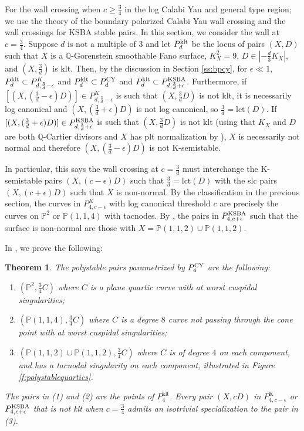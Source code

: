 \documentclass[11pt]{amsart}
\numberwithin{equation}{section}
\newtheorem{thm}[theorem]{Theorem}
\theoremstyle{definition}
\newcommand{\bQ}{\mathbb{Q}}
\newcommand{\KSBA}{{\rm KSBA}}
\newcommand{\bP}{\mathbb{P}}
\newcommand{\klt}{\mathrm{klt}}
\newcommand{\lct}{\mathrm{lct}}
\newcommand{\K}{\mathrm{K}}
\begin{document}
For the wall crossing when $c \ge \frac{3}{4}$ in the log Calabi Yau and general type region; we use the theory of the boundary polarized Calabi Yau wall crossing and the wall crossings for KSBA stable pairs.  In this section, we consider the wall at $c = \frac{3}{4}$.  Suppose $d$ is not a multiple of $3$ and let $P_d^{\rm klt} $ be the locus of pairs $(X,D)$ such that $X$ is a $\bQ$-Gorenstein smoothable Fano surface, $K_X^2 = 9$, $D \in |-\frac{d}{3}K_X|$, and $(X,\frac{3}{d})$ is klt.  Then, by the discussion in Section \ref{ss:bpcy}, for $\epsilon \ll1$, $P_d^{\rm klt} \subset P^K_{d, \frac{3}{d} - \epsilon}$ and $P_d^{\rm klt} \subset P^{\rm CY}_{d}$ and $P_d^{\rm klt} \subset P^{\rm KSBA}_{d, \frac{3}{d} + \epsilon}$.  Furthermore, if $[(X,(\frac{3}{d}-\epsilon)D)] \in P^K_{d, \frac{3}{d} - \epsilon} $ is such that $(X,\frac{3}{d}D)$ is not klt, it is necessarily log canonical and $(X,(\frac{3}{d} + \epsilon)D)$ is not log canonical, so $\frac{3}{d} = \lct (D)$. If $[(X,(\frac{3}{d}+\epsilon)D)] \in P^{\rm KSBA}_{d, \frac{3}{d} + \epsilon} $ is such that $(X,\frac{3}{d}D)$ is not klt (using that $K_X$ and $D$ are both $\bQ$-Cartier divisors and $X$ has plt normalization by \cite[Theorem 7.1]{hacking}), $X$ is necessarily not normal and therefore $(X,(\frac{3}{d} - \epsilon)D)$ is not K-semistable.  

In particular, this says the wall crossing at $c=\frac{3}{d}$ must interchange the K-semistable pairs $(X,(c-\epsilon)D)$ such that $\frac{3}{d} = \lct(D)$ with the slc pairs $(X,(c+\epsilon)D)$ such that $X$ is non-normal.  By the classification in the previous section, the curves in $P^K_{4,c -\epsilon}$ with log canonical threshold $c$ are precisely the curves on $\bP^2$ or $\bP(1,1,4)$ with tacnodes.  By \cite[Section 11]{hacking}, the pairs in $P^{\KSBA}_{4,c+\epsilon}$ such that the surface is non-normal are those with $X = \bP(1,1,2)  \cup \bP(1,1,2)$.

In \cite{BABWILD}, we prove the following: 

\begin{thm}
	The polystable pairs parametrized by $P_4^{\rm CY}$ are the following:
	\begin{enumerate}
		\item $(\bP^2,\frac{3}{4}C)$ where $C$ is a plane quartic curve with at worst cuspidal singularities;
		\item $(\bP(1,1,4), \frac{3}{4}C)$ where $C$ is a degree $8$ curve not passing through the cone point with at worst cuspidal singularities;
		\item $(\bP(1,1,2)\cup \bP(1,1,2), \frac{3}{4}C)$ where $C$ is of degree $4$ on each component, and has a tacnodal singularity on each component, illustrated in Figure \ref{f:polystablequartics}. 
	\end{enumerate}
    The pairs in (1) and (2) are the points of $P_4^{\klt}$.  Every pair $(X,cD)$ in $P^{\K}_{4,c-\epsilon}$  or $P^{\KSBA}_{4,c+\epsilon}$ that is not klt when $c = \frac{3}{4}$ admits an isotrivial specialization to the pair in (3).
\end{thm}
\end{document}
